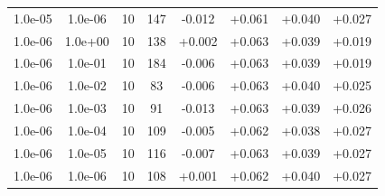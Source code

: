 \documentclass[11pt,a4paper]{article}
\begin{document}
\begin{table}
{\begin{tabular}{*{8}c}
 1.0e-05 	 & 1.0e-06 	 & 10 & 147 	 & -0.012 & +0.061 & +0.040 & +0.027 \\ 
 1.0e-06 	 & 1.0e+00 	 & 10 & 138 	 & +0.002 & +0.063 & +0.039 & +0.019 \\ 
 1.0e-06 	 & 1.0e-01 	 & 10 & 184 	 & -0.006 & +0.063 & +0.039 & +0.019 \\ 
 1.0e-06 	 & 1.0e-02 	 & 10 & 83 	 & -0.006 & +0.063 & +0.040 & +0.025 \\ 
 1.0e-06 	 & 1.0e-03 	 & 10 & 91 	 & -0.013 & +0.063 & +0.039 & +0.026 \\ 
 1.0e-06 	 & 1.0e-04 	 & 10 & 109 	 & -0.005 & +0.062 & +0.038 & +0.027 \\ 
 1.0e-06 	 & 1.0e-05 	 & 10 & 116 	 & -0.007 & +0.063 & +0.039 & +0.027 \\ 
 1.0e-06 	 & 1.0e-06 	 & 10 & 108 	 & +0.001 & +0.062 & +0.040 & +0.027 \\ 
\end{tabular}}
\label{Tab::1}
\end{table} 
\end{document}
